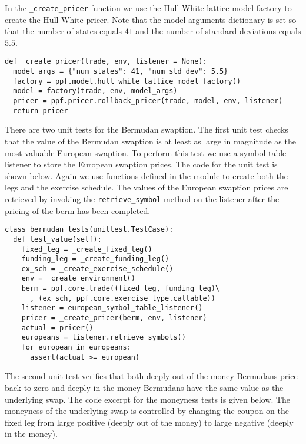 In the \verb|_create_pricer| function we use the Hull-White lattice model factory to create the Hull-White pricer. Note that the model arguments dictionary is set so that the number of states equals 
$41$ and the number of standard deviations equals $5.5$. 

\begin{verbatim}
def _create_pricer(trade, env, listener = None):
  model_args = {"num states": 41, "num std dev": 5.5} 
  factory = ppf.model.hull_white_lattice_model_factory()
  model = factory(trade, env, model_args)
  pricer = ppf.pricer.rollback_pricer(trade, model, env, listener)
  return pricer
\end{verbatim}

There are two unit tests for the Bermudan swaption. The first unit test checks that the value of the Bermudan swaption is at least as large in magnitude as the most valuable European swaption. 
To perform this test we use a symbol table listener to store the European swaption prices. The code for the unit test is shown below. Again we use functions defined in the module to 
create both the legs and the exercise schedule. The values of the European swaption prices are retrieved by invoking the \verb|retrieve_symbol| method on the listener after the pricing of 
the berm has been completed.

\begin{verbatim}
class bermudan_tests(unittest.TestCase):
  def test_value(self):
    fixed_leg = _create_fixed_leg()
    funding_leg = _create_funding_leg()
    ex_sch = _create_exercise_schedule()
    env = _create_environment() 
    berm = ppf.core.trade((fixed_leg, funding_leg)\
      , (ex_sch, ppf.core.exercise_type.callable))   
    listener = european_symbol_table_listener()
    pricer = _create_pricer(berm, env, listener)
    actual = pricer()
    europeans = listener.retrieve_symbols()
    for european in europeans:
      assert(actual >= european)  
\end{verbatim}

The second unit test verifies that both deeply out of the money Bermudans price back to zero and deeply in the money Bermudans have the same value as the underlying swap. The code excerpt for 
the moneyness tests is given below. The moneyness of the underlying swap is controlled by changing the coupon on the fixed leg from large positive (deeply out of the money) to large negative 
(deeply in the money).

